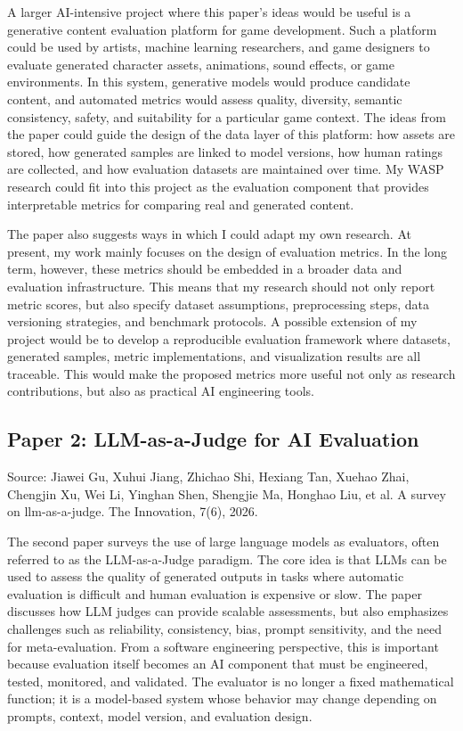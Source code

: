 \documentclass{article}
\begin{document}
A larger AI-intensive project where this paper's ideas would be useful is a generative content evaluation platform for game development. Such a platform could be used by artists, machine learning researchers, and game designers to evaluate generated character assets, animations, sound effects, or game environments. In this system, generative models would produce candidate content, and automated metrics would assess quality, diversity, semantic consistency, safety, and suitability for a particular game context. The ideas from the paper could guide the design of the data layer of this platform: how assets are stored, how generated samples are linked to model versions, how human ratings are collected, and how evaluation datasets are maintained over time. My WASP research could fit into this project as the evaluation component that provides interpretable metrics for comparing real and generated content.

The paper also suggests ways in which I could adapt my own research. At present, my work mainly focuses on the design of evaluation metrics. In the long term, however, these metrics should be embedded in a broader data and evaluation infrastructure. This means that my research should not only report metric scores, but also specify dataset assumptions, preprocessing steps, data versioning strategies, and benchmark protocols. A possible extension of my project would be to develop a reproducible evaluation framework where datasets, generated samples, metric implementations, and visualization results are all traceable. This would make the proposed metrics more useful not only as research contributions, but also as practical AI engineering tools.



\subsection{Paper 2: LLM-as-a-Judge for AI Evaluation}

Source: \cite{gu2026survey} Jiawei Gu, Xuhui Jiang, Zhichao Shi, Hexiang Tan, Xuehao Zhai, Chengjin Xu, Wei Li, Yinghan Shen, Shengjie
Ma, Honghao Liu, et al. A survey on llm-as-a-judge. The Innovation, 7(6), 2026.

The second paper surveys the use of large language models as evaluators, often referred to as the LLM-as-a-Judge paradigm. The core idea is that LLMs can be used to assess the quality of generated outputs in tasks where automatic evaluation is difficult and human evaluation is expensive or slow. The paper discusses how LLM judges can provide scalable assessments, but also emphasizes challenges such as reliability, consistency, bias, prompt sensitivity, and the need for meta-evaluation. From a software engineering perspective, this is important because evaluation itself becomes an AI component that must be engineered, tested, monitored, and validated. The evaluator is no longer a fixed mathematical function; it is a model-based system whose behavior may change depending on prompts, context, model version, and evaluation design.
\end{document}
